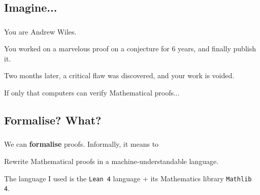 
\subsection{Imagine...}
\begin{frame}\frametitle{\insertsubsection}

You are Andrew Wiles.

You worked on a marvelous proof on a conjecture for \(6\) years, and finally publish it.

Two months later, a critical flaw was discovered, and your work is voided. 

If only that computers can verify Mathematical proofs...

\end{frame}



\subsection{Formalise? What?}
\begin{frame}\frametitle{\insertsubsection}

We can \textbf{formalise} proofs. Informally, it means to

\begin{definition}
  Rewrite Mathematical proofs in a machine-understandable language.
\end{definition}

The language I used is the \texttt{Lean 4} language + its Mathematics library \texttt{Mathlib 4}.

\end{frame}



